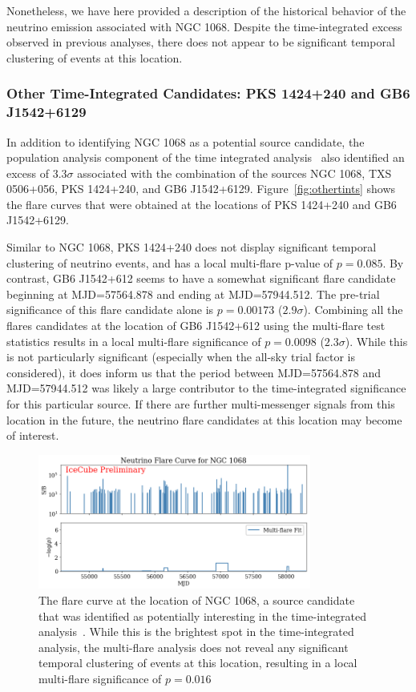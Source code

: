 Nonetheless, we have here provided a description of the historical behavior of the neutrino emission associated with NGC 1068. Despite the time-integrated excess observed in previous analyses, there does not appear to be significant temporal clustering of events at this location.

\subsubsection{Other Time-Integrated Candidates: PKS 1424+240  and GB6 J1542+6129}
In addition to identifying NGC 1068 as a potential source candidate, the population analysis component of the time integrated analysis~\cite{10yr_tint} also identified an excess of $3.3 \sigma$ associated with the combination of the sources NGC 1068, TXS 0506+056, PKS 1424+240, and GB6 J1542+6129. Figure~\ref{fig:othertints} shows the flare curves that were obtained at the locations of PKS 1424+240 and GB6 J1542+6129. 

Similar to NGC 1068, PKS 1424+240 does not display significant temporal clustering of neutrino events, and has a local multi-flare p-value of $p=0.085$. By contrast, GB6 J1542+612 seems to have a somewhat significant flare candidate beginning at MJD=57564.878 and ending at MJD=57944.512. The pre-trial significance of this flare candidate alone is $p=0.00173$ ($2.9 \sigma$). Combining all the flares candidates at the location of GB6 J1542+612 using the multi-flare test statistics results in a local multi-flare significance of $p=0.0098$ ($2.3 \sigma$). While this is not particularly significant (especially when the all-sky trial factor is considered), it does inform us that the period between MJD=57564.878 and MJD=57944.512 was likely a large contributor to the time-integrated significance for this particular source. If there are further multi-messenger signals from this location in the future, the neutrino flare candidates at this location may become of interest. 

\begin{figure}[h]
\centering
\includegraphics[width=0.8\textwidth]{figs/fcurve_NGC1068.png}
\caption{The flare curve at the location of NGC 1068, a source candidate that was identified as potentially interesting in the time-integrated analysis~\cite{10yr_tint}. While this is the brightest spot in the time-integrated analysis, the multi-flare analysis does not reveal any significant temporal clustering of events at this location, resulting in a local multi-flare significance of $p=0.016$}
\label{fig:ngc1068}
\end{figure}


